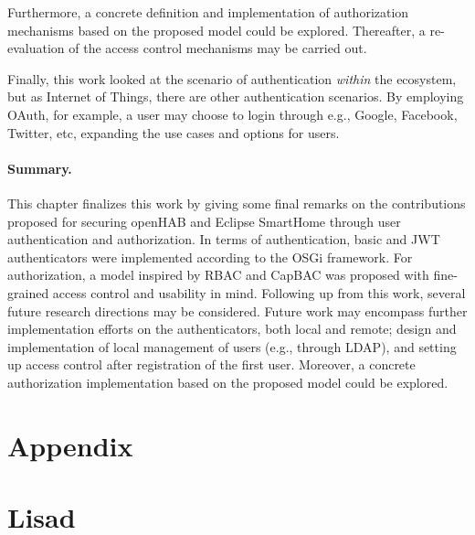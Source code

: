 \documentclass[12pt]{article}
\renewcommand{\refname}{Viidatud kirjandus}%
\renewcommand{\appendixname}{Lisad}%
\begin{document}
Furthermore, a concrete definition and implementation of authorization mechanisms based on the proposed model could be explored. Thereafter, a re-evaluation of the access control mechanisms may be carried out.

Finally, this work looked at the scenario of authentication \emph{within} the ecosystem, but as Internet of Things, there are other authentication scenarios. By employing OAuth, for example, a user may choose to login through e.g., Google, Facebook, Twitter, etc, expanding the use cases and options for users.

\paragraph{Summary.} This chapter finalizes this work by giving some final remarks on the contributions proposed for securing openHAB and Eclipse SmartHome through user authentication and authorization. In terms of authentication, basic and JWT authenticators were implemented according to the OSGi framework. For authorization, a model inspired by RBAC and CapBAC was proposed with fine-grained access control and usability in mind. Following up from this work, several future research directions may be considered. Future work may encompass further implementation efforts on the authenticators, both local and remote; design and implementation of local management of users (e.g., through LDAP), and setting up access control after registration of the first user. Moreover, a concrete authorization implementation based on the proposed model could be explored. 

\newpage



\addcontentsline{toc}{section}{\refname}



\newpage
%
  {\section*{Appendix}
  }%
  {\section*{Lisad}
  }
  
\end{document}
